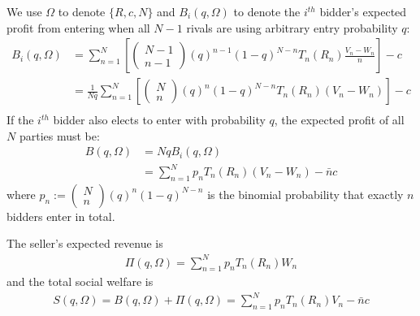 \documentclass[11pt]{elegantbook}
\begin{document}
We use $\Omega$ to denote $\{R,c,N\}$ and $B_i(q,\Omega)$ to denote the $i^{th}$ bidder's expected profit from entering when all $N-1$ rivals are using arbitrary entry probability $q$:
\begin{equation}
    \begin{aligned}
        B_i(q,\Omega)&=\sum_{n=1}^N\left[
            \begin{pmatrix}
            N-1\\
            n-1
        \end{pmatrix}
        (q)^{n-1}(1-q)^{N-n}T_n(R_n)\frac{V_n-W_n}{n}
        \right]-c\\
        &=\frac{1}{Nq}\sum_{n=1}^N\left[
            \begin{pmatrix}
            N\\
            n
        \end{pmatrix}
        (q)^{n}(1-q)^{N-n}T_n(R_n)\left(V_n-W_n\right)
        \right]-c\\
    \end{aligned}
    \nonumber
\end{equation}
If the $i^{th}$ bidder also elects to enter with probability $q$, the expected profit of all $N$ parties must be:
\begin{equation}
    \begin{aligned}
        B(q,\Omega)&=NqB_i(q,\Omega)\\
        &=\sum_{n=1}^N p_n T_n(R_n)(V_n-W_n)-\bar{n}c
    \end{aligned}
    \nonumber
\end{equation}
where $p_n:=\begin{pmatrix}N\\n\end{pmatrix}(q)^{n}(1-q)^{N-n}$ is the binomial probability that exactly $n$ bidders enter in total.

The seller's expected revenue is
\begin{equation}
    \begin{aligned}
        \Pi(q,\Omega)=\sum_{n=1}^N p_n T_n(R_n)W_n
    \end{aligned}
    \nonumber
\end{equation}
and the total social welfare is
\begin{equation}
    \begin{aligned}
        S(q,\Omega)=B(q,\Omega)+\Pi(q,\Omega)=\sum_{n=1}^N p_n T_n(R_n)V_n-\bar{n}c
    \end{aligned}
    \nonumber
\end{equation}
\end{document}
